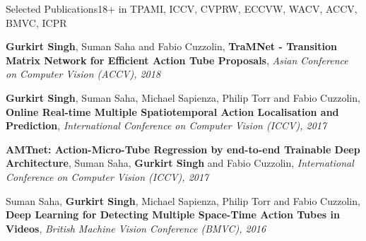 \documentclass{resume_long} %
\begin{document}
\begin{rSection}{Selected Publications}{18+\footnotesize{ in TPAMI, ICCV, CVPRW, ECCVW, WACV, ACCV, BMVC, ICPR}}

\vspace{-0.03in}
\small{\textbf{Gurkirt Singh}, Suman Saha and Fabio Cuzzolin},
\textbf{TraMNet - Transition Matrix Network for Efficient Action Tube Proposals},
\textit{\small{Asian Conference on Computer Vision (ACCV), 2018}}






\vspace{-0.03in}
\small{\textbf{Gurkirt Singh}, Suman Saha, Michael Sapienza, Philip Torr and Fabio Cuzzolin},
\textbf{Online Real-time Multiple Spatiotemporal Action Localisation and Prediction},
\textit{\small{International Conference on Computer Vision (ICCV), 2017}}


\vspace{-0.03in}
\textbf{AMTnet: Action-Micro-Tube Regression by end-to-end Trainable Deep Architecture},
\small{Suman Saha, \textbf{Gurkirt Singh} and Fabio Cuzzolin},
\textit{\small{International Conference on Computer Vision (ICCV), 2017}}


\vspace{-0.03in}
\small{Suman Saha, \textbf{Gurkirt Singh}, Michael Sapienza, Philip Torr and Fabio Cuzzolin},
\textbf{Deep Learning for Detecting Multiple Space-Time Action Tubes in Videos},
\textit{\small{British Machine Vision Conference (BMVC), 2016}}


\end{rSection}
\end{document}
